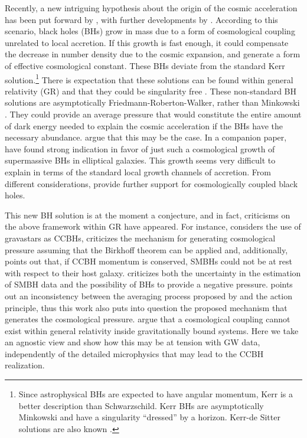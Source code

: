 \documentclass[fleqn,usenatbib,useAMS]{mnras}
\begin{document}
Recently, a new intriguing hypothesis about the origin of the cosmic acceleration has been put forward by \citet{Croker:2019mup, Croker:2020plg}, with further developments by \citet{Farrah:2023opk}. According to this scenario, black holes (BHs) grow in mass due to a form of cosmological coupling unrelated to local accretion. If this growth is fast enough, it could compensate the decrease in number density due to the cosmic expansion, and generate a form of effective cosmological constant. These BHs deviate from the standard Kerr solution.\footnote{Since astrophysical BHs are expected to have angular momentum, Kerr is a better description than Schwarzschild. Kerr BHs are  asymptotically Minkowski and have a singularity ``dressed'' by a horizon. Kerr-de Sitter solutions are also known \citep[for a review see][]{Akcay:2010vt}.} There is expectation that these solutions can be found within general relativity (GR) and that they could be singularity free \citep[see also][]{Dymnikova:2016nlb}. These non-standard BH solutions are asymptotically Friedmann-Roberton-Walker, rather than Minkowski \citep{Faraoni:2007es, Croker:2019kje, Croker:2019mup, Croker:2020plg}.  They could provide an average pressure that would constitute the entire amount of dark energy needed to explain the cosmic acceleration if the BHs have the necessary abundance. \citet{Farrah:2023opk} argue that this {may be} the case. In a companion paper, \citet{2023ApJ...943..133F} have found strong indication in favor of just such a cosmological growth of supermassive BHs in elliptical galaxies. This growth seems very difficult to explain in terms of the standard local growth channels of accretion.
{From different considerations, \citet{Gao:2023keg, Cadoni:2023lqe, Cadoni:2023lum} provide further support for cosmologically coupled black holes.}



This new BH solution is at the moment a conjecture, and in fact, criticisms on the above framework within GR have appeared.  
For instance, \citet{Avelino:2023rac} considers the use of gravastars as CCBHs, criticizes the mechanism for generating cosmological pressure assuming that the Birkhoff theorem can be applied and, additionally, points out that, if CCBH momentum is conserved, SMBHs could not be at rest with respect to their host galaxy. \citet{Parnovsky:2023wkc} criticizes both the uncertainty in the estimation of SMBH data and the possibility of BHs to provide a negative pressure. \citet{Mistele:2023fds} points out an inconsistency between the averaging process proposed by \citet{Croker:2019mup} and the action principle, thus this work also puts into question the proposed mechanism that generates the cosmological pressure. \citet{Wang:2023aqe} argue that a cosmological coupling cannot exist within general relativity
inside gravitationally bound systems.
Here we take an agnostic view and show how this may be at tension with GW data, independently of the detailed microphysics that may lead to the CCBH realization.
\end{document}
